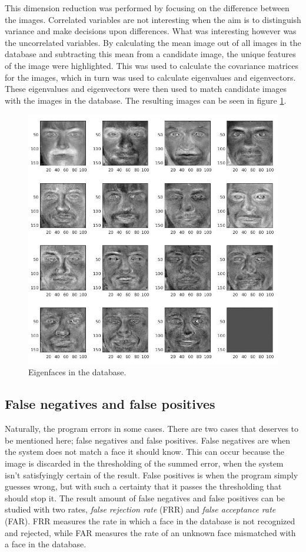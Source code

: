 This dimension reduction was performed by focusing on the difference between
the images. Correlated variables are not interesting when the aim is to
distinguish variance and make decisions upon differences. What was interesting
however was the uncorrelated variables. By calculating the mean image out of
all images in the database and subtracting this mean from a candidate image,
the unique features of the image were highlighted. This was used to calculate
the covariance matrices for the images, which in turn was used to calculate
eigenvalues and eigenvectors. These eigenvalues and eigenvectors were then
used to match candidate images with the images in the database. The resulting images can be seen in figure \ref{fig:eigen}.

\begin{figure}[htbp]
  \centering
  \includegraphics[width=\columnwidth]{images/eigen.jpg}
  \caption{Eigenfaces in the database.}
  \label{fig:eigen}
\end{figure}

\subsection{False negatives and false positives}
Naturally, the program errors in some cases. There are two cases that deserves
to be mentioned here; false negatives and false positives. False negatives are
when the system does not match a face it should know. This can occur because
the image is discarded in the thresholding of the summed error, when the
system isn’t satisfyingly certain of the result. False positives is when the
program simply guesses wrong, but with such a certainty that it passes the
thresholding that should stop it. The result amount of false negatives and
false positives can be studied with two rates, \emph{false rejection rate}
(FRR) and \emph{false acceptance rate} (FAR). FRR measures the rate in which a
face in the database is not recognized and rejected, while FAR measures the
rate of an unknown face mismatched with a face in the database.
